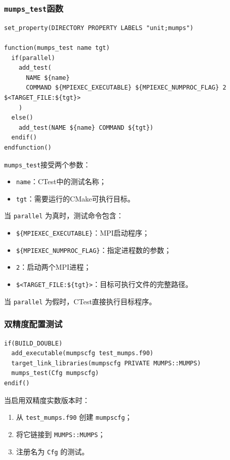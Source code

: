 \subsubsection{\texttt{mumps\_test}函数}

\begin{lstlisting}
set_property(DIRECTORY PROPERTY LABELS "unit;mumps")

function(mumps_test name tgt)
  if(parallel)
    add_test(
      NAME ${name}
      COMMAND ${MPIEXEC_EXECUTABLE} ${MPIEXEC_NUMPROC_FLAG} 2 $<TARGET_FILE:${tgt}>
    )
  else()
    add_test(NAME ${name} COMMAND ${tgt})
  endif()
endfunction()
\end{lstlisting}

\texttt{mumps\_test}接受两个参数：

\begin{itemize}
  \item \texttt{name}：CTest中的测试名称；
  \item \texttt{tgt}：需要运行的CMake可执行目标。
\end{itemize}

当 \texttt{parallel} 为真时，测试命令包含：

\begin{itemize}
  \item \texttt{\$\{MPIEXEC\_EXECUTABLE\}}：MPI启动程序；
  \item \texttt{\$\{MPIEXEC\_NUMPROC\_FLAG\}}：指定进程数的参数；
  \item \texttt{2}：启动两个MPI进程；
  \item \texttt{\$\textless{}TARGET\_FILE:\$\{tgt\}\textgreater{}}：目标可执行文件的完整路径。
\end{itemize}

当 \texttt{parallel} 为假时，CTest直接执行目标程序。

\subsubsection{双精度配置测试}

\begin{lstlisting}
if(BUILD_DOUBLE)
  add_executable(mumpscfg test_mumps.f90)
  target_link_libraries(mumpscfg PRIVATE MUMPS::MUMPS)
  mumps_test(Cfg mumpscfg)
endif()
\end{lstlisting}

当启用双精度实数版本时：

\begin{enumerate}
  \item 从 \texttt{test\_mumps.f90} 创建 \texttt{mumpscfg}；
  \item 将它链接到 \texttt{MUMPS::MUMPS}；
  \item 注册名为 \texttt{Cfg} 的测试。
\end{enumerate}

